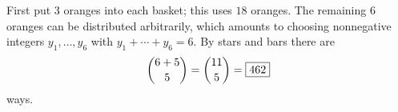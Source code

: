 First put $3$ oranges into each basket; this uses $18$ oranges. The remaining $6$ oranges can be distributed arbitrarily, which amounts to choosing nonnegative integers $y_1,\dots,y_6$ with $y_1+\cdots+y_6=6$. By stars and bars there are
\[\dbinom{6+5}{5}=\dbinom{11}{5}=\boxed{462}\]
ways.
